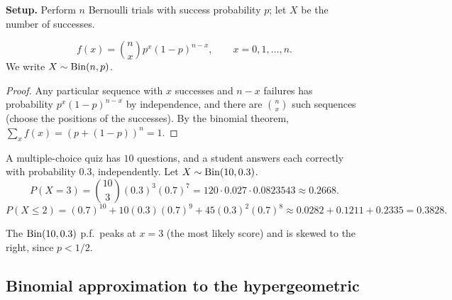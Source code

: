 \textbf{Setup.} Perform $n$ Bernoulli trials with success probability $p$; let $X$ be the
number of successes.

\begin{theorem}[Binomial p.f.]
\[
  f(x) = \binom nx p^x (1-p)^{n-x}, \qquad x = 0,1,\dots,n.
\]
We write $X\sim\operatorname{Bin}(n,p)$.
\end{theorem}

\begin{proof}
Any particular sequence with $x$ successes and $n-x$ failures has probability
$p^x(1-p)^{n-x}$ by independence, and there are $\binom nx$ such sequences (choose the
positions of the successes). By the binomial theorem,
$\sum_x f(x) = (p + (1-p))^n = 1$.
\end{proof}

\begin{example}
A multiple-choice quiz has $10$ questions, and a student answers each correctly with
probability $0.3$, independently. Let $X\sim\operatorname{Bin}(10, 0.3)$.
\[
  P(X = 3) = \binom{10}{3}(0.3)^3(0.7)^7 = 120 \cdot 0.027 \cdot 0.0823543 \approx 0.2668.
\]
\[
  P(X \le 2) = (0.7)^{10} + 10(0.3)(0.7)^9 + 45(0.3)^2(0.7)^8
  \approx 0.0282 + 0.1211 + 0.2335 = 0.3828.
\]
\end{example}

\begin{center}
\end{center}
The $\operatorname{Bin}(10,0.3)$ p.f.\ peaks at $x=3$ (the most likely score) and is skewed to the right,
since $p<1/2$.

\subsection{Binomial approximation to the hypergeometric}

